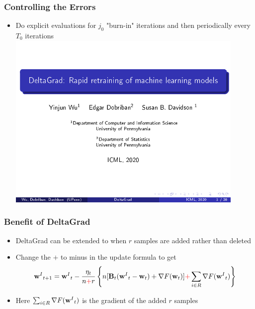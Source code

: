 \documentclass[pdf]{beamer}
\begin{document}
\begin{frame}
  \frametitle{Controlling the Errors}
  \begin{itemize}
    \item Do explicit evaluations for $j_{0}$ "burn-in" iterations and then periodically every $T_{0}$ iterations
    \includegraphics[page=46,clip,trim=0.5cm 1cm 0cm 1cm,width=0.9\textwidth]{images/Slides.pdf}
  \end{itemize}
\end{frame}

\begin{frame}
  \frametitle{Benefit of DeltaGrad}
  \begin{itemize}
    \item DeltaGrad can be extended to when $r$ samples are added rather than deleted
    \item Change the $+$ to minus in the update formula to get 
    \[
      {\textbf{w}^{I}}_{t+1}  = {\textbf{w}^{I}}_{t} - \frac{\eta_{t}}{n\textcolor{red}{+}r} \left\{ n[\textbf{B}_{t}({\textbf{w}^{I}}_t - \textbf{w}_t) + \nabla F(\textbf{w}_t)] \textcolor{red}{+} \sum_{i\in R} \nabla F({\textbf{w}^{I}}_t)\right\}
    \]
    \item Here $\sum_{i\in R} \nabla F({\textbf{w}^{I}}_t)$ is the gradient of the added $r$ samples
  \end{itemize}
  
\end{frame}
\end{document}
